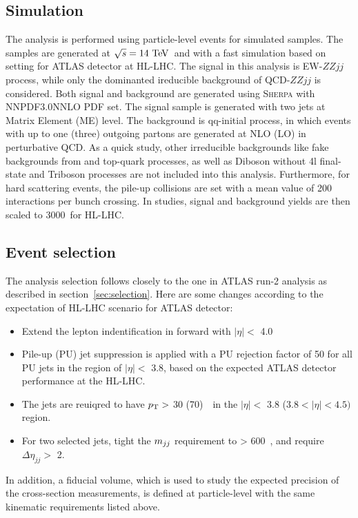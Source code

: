 \subsection{Simulation}

The analysis is performed using particle-level events for simulated samples.
The samples are generated at $\sqrt{s} = 14~\text{Te\kern -0.1em V}$~and with a fast simulation based on setting for ATLAS detector at HL-LHC.
The signal in this analysis is EW-$ZZjj$ process, while only the dominanted ireducible background of QCD-$ZZjj$ is considered.
Both signal and background are generated using \textsc{Sherpa} with NNPDF3.0NNLO PDF set.
The signal sample is generated with two jets at Matrix Element (ME) level.
The background is qq-initial process, in which events with up to one (three) outgoing partons are generated at NLO (LO) in perturbative QCD.
As a quick study, other irreducible backgrounds like fake backgrounds from \Zjet and top-quark processes, as well as Diboson without 4l final-state and Triboson processes are not included into this analysis.
Furthermore, for hard scattering events, the pile-up collisions are set with a mean value of 200 interactions per bunch crossing.
In studies, signal and background yields are then scaled to 3000~\ifb for HL-LHC.

\subsection{Event selection}

The analysis selection follows closely to the one in ATLAS run-2 analysis as described in section~\ref{sec:selection}.
Here are some changes according to the expectation of HL-LHC scenario for ATLAS detector:
\begin{itemize}
	\item Extend the lepton indentification in forward with $|\eta| <$ 4.0
	\item Pile-up (PU) jet suppression is applied with a PU rejection factor of 50 for all PU jets in the region of $|\eta| <$ 3.8, based on the expected ATLAS detector performance at the HL-LHC.
	\item The jets are reuiqred to have $p_{\text{T}} >$ 30 (70)~\gev~in the $|\eta| <$ 3.8 ($3.8 < |\eta| < 4.5)$ region.
	\item For two selected jets, tight the $m_{jj}$ requirement to > 600~\gev, and require $\Delta \eta_{jj} >$ 2.
\end{itemize}
In addition, a fiducial volume, which is used to study the expected precision of the cross-section measurements,
 is defined at particle-level with the same kinematic requirements listed above.

